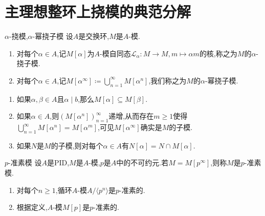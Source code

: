 \section{主理想整环上挠模的典范分解}

\begin{definition}{$\alpha$-挠模,$\alpha$-幂挠子模}{}
	设$A$是交换环,$M$是$A$-模.
	\begin{enumerate}
		\item 对每个$\alpha\in A$,记$M\left[\alpha\right]$为$A$-模自同态$\mathcal{L}_{\alpha}:M\to M,m\mapsto\alpha m$的核,称之为$M$的$\alpha$-挠子模.
		\item 对每个$\alpha\in A$,记$M[\alpha^{\infty}]\coloneq\bigcup\limits_{n=1}^{\infty}M[\alpha^{n}]$,我们称之为$M$的$\alpha$-幂挠子模.
	\end{enumerate}
\end{definition}

\begin{remark}{}{}
	\begin{enumerate}
		\item 如果$\alpha,\beta\in A$且$\alpha\mid b$,那么$M[\alpha]\subseteq M[\beta]$.
		\item 如果$\alpha\in A$,则$\left(M[\alpha^{n}]\right)_{n=1}^{\infty}$递增,从而存在$m\geq 1$使得$\bigcup\limits_{n=1}^{\infty}M[\alpha^{n}]=M[\alpha^{m}]$,可见$M[\alpha^{\infty}]$确实是$M$的子模.
		\item 如果$N$是$M$的子模,则对每个$\alpha\in A$有$N[\alpha]=N\cap M[\alpha]$.
	\end{enumerate}
\end{remark}

\begin{definition}{$p$-准素模}{}
	设$A$是PID,$M$是$A$-模,$p$是$A$中的不可约元.若$M=M\left[p^{\infty}\right]$,则称$M$是$p$-准素模.
\end{definition}

\begin{remark}{}{}
	\begin{enumerate}
		\item 对每个$n\geq 1$,循环$A$-模$A/\langle p^{n}\rangle$是$p$-准素的.
		\item 根据定义,$A$-模$M[p]$是$p$-准素的.
	\end{enumerate}
\end{remark}

